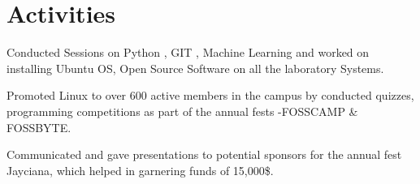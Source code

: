\documentclass[]{deedy-resume-openfont}
\begin{document}
\begin{minipage}[t]{0.66\textwidth}

\section{Activities }


\begin{tightemize}
\item \normalsize {Conducted Sessions on Python , GIT , Machine Learning and worked on installing Ubuntu OS, Open Source Software on all the laboratory Systems.}
\item \normalsize {Promoted Linux to over 600 active members in the campus by conducted quizzes, programming competitions as part of the annual fests -FOSSCAMP & FOSSBYTE.}
\end{tightemize}
\sectionsep


\begin{tightemize} 
\item \normalsize {Communicated and gave presentations to potential sponsors for the annual fest Jayciana, which helped in garnering funds of 15,000\$.} \\

\end{tightemize}
\sectionsep



\sectionsep



\end{minipage} 
\end{document}
